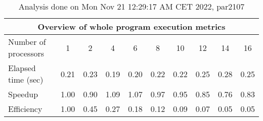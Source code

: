 \begin{table}[h]
\begin{center}
\begin{tabular}{|l|c|c|c|c|c|c|c|c|c|}
\hline
\multicolumn{10}{|c|}{Overview of whole program execution metrics} \\
\hline
\hline
Number of processors & 1 & 2 & 4 & 6 & 8 & 10 & 12 & 14 & 16 \\
\hline
Elapsed time (sec)      &       0.21 &       0.23 &       0.19 &       0.20 &       0.22 &       0.22 &       0.25 &       0.28 &       0.25 \\
\hline
Speedup                 &       1.00 &       0.90 &       1.09 &       1.07 &       0.97 &       0.95 &       0.85 &       0.76 &       0.83 \\
\hline
Efficiency              &       1.00 &       0.45 &       0.27 &       0.18 &       0.12 &       0.09 &       0.07 &       0.05 &       0.05 \\
\hline
\end{tabular}
\end{center}
\caption{ Analysis done on Mon Nov 21 12:29:17 AM CET 2022, par2107}
\end{table}
